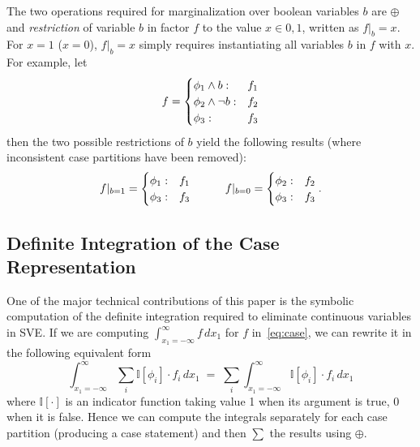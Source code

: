 \documentclass[letterpaper]{article}
\newcommand{\I}{\mathbb{I}}
\begin{document}
The two operations required for marginalization over boolean variables
$b$ are $\oplus$ and \emph{restriction} of variable $b$ in factor $f$
to the value $x \in {0,1}$, written as $f|_b=x$.
For $x = 1$ ($x = 0$), $f|_b=x$ simply requires instantiating all
variables $b$ in $f$ with $x$.  For example, let
\vspace{-1mm}
\begin{align*}
f = \begin{cases}
    \phi_1 \land b: & f_1 \\ 
    \phi_2 \land \neg b: & f_2 \\ 
    \phi_3 : & f_3 \\ 
  \end{cases}
  \vspace{-3mm}
\end{align*}
then the two possible restrictions of $b$ yield the following 
results (where inconsistent case partitions have been removed):
\vspace{-4mm}
\begin{align*}
f|_{b=1} = \begin{cases}
    \phi_1: & f_1 \\ 
    \phi_3: & f_3 \\ 
  \end{cases}
\hspace{10mm}
f|_{b=0} = \begin{cases}
    \phi_2: & f_2 \\ 
    \phi_3: & f_3 \\ 
  \end{cases}.
  \vspace{-4mm}
\end{align*}

\subsection{Definite Integration of the Case Representation}

\label{sec:def_int}

One of the major technical contributions of this paper is the symbolic
computation of the definite integration required to eliminate
continuous variables in SVE.  If we are 
computing $\int_{x_1=-\infty}^{\infty} f \, dx_1$ for $f$ 
in~\eqref{eq:case}, we can rewrite it in the following equivalent form
\vspace{-2mm}
\begin{equation}
\int_{x_1=-\infty}^{\infty} \sum_i \I[\phi_i] \cdot f_i \, dx_1 \; = \; \sum_i \int_{x_1=-\infty}^{\infty} \I[\phi_i] \cdot f_i \, dx_1 \label{eq:int_decomp}
\end{equation}
where $\I[\cdot]$ is an indicator function taking value 1 when
its argument is true, 0 when it is false.  Hence we can compute
the integrals separately for each case partition (producing a 
case statement) and then $\sum$ the results using $\oplus$.
\end{document}
